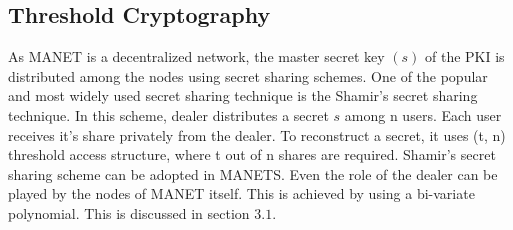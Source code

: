 \documentclass[11pt,a4paper]{llncs}
\begin{document}
\subsection{Threshold Cryptography}

As MANET is a decentralized network, the master secret key $(s)$ of the PKI is distributed among the nodes using secret sharing schemes. One of the popular and most widely used secret sharing technique is the Shamir's secret sharing technique\cite{shamir}. In this scheme, dealer distributes a secret $s$ among n users. Each user receives it's share privately from the dealer. To reconstruct a secret, it uses (t, n) threshold access structure, where t out of n shares are required. Shamir's secret sharing scheme can be adopted in MANETS. Even the role of the dealer can be played by the nodes of MANET itself. This is achieved by using a bi-variate polynomial. This is discussed in section $3.1$.
\end{document}
